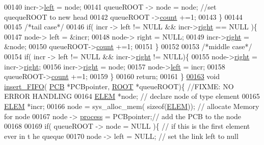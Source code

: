 \begin{DoxyCode}
00140                 incr->\hyperlink{structpage_a450d16b8cb803158a4dab05bb36fd7f5}{left} = node;
00141                 queueROOT -> node = node; \textcolor{comment}{//set quequeROOT to new head}
00142                 queueROOT ->\hyperlink{structroot_afa78d0408d4af29e936332a04739d59c}{count} +=1;
00143         \}
00144         
00145         \textcolor{comment}{/*tail case*/}
00146         \textcolor{keywordflow}{if}( incr -> left != NULL && incr->\hyperlink{structpage_a59bb1b5eca2d579befcc93a2833f4dfd}{right} == NULL )\{
00147                 node-> left = &incr;
00148                 node-> right = NULL;
00149                 incr->\hyperlink{structpage_a59bb1b5eca2d579befcc93a2833f4dfd}{right} = &node;
00150                 queueROOT->\hyperlink{structroot_afa78d0408d4af29e936332a04739d59c}{count} +=1;
00151         \}
00152         
00153         \textcolor{comment}{/*middle case*/}
00154         \textcolor{keywordflow}{if}( incr -> left != NULL && incr->\hyperlink{structpage_a59bb1b5eca2d579befcc93a2833f4dfd}{right} != NULL)\{
00155                 node->\hyperlink{structpage_a59bb1b5eca2d579befcc93a2833f4dfd}{right} = incr->\hyperlink{structpage_a59bb1b5eca2d579befcc93a2833f4dfd}{right};
00156                 incr->\hyperlink{structpage_a59bb1b5eca2d579befcc93a2833f4dfd}{right} = node;
00157                 node->\hyperlink{structpage_a450d16b8cb803158a4dab05bb36fd7f5}{left} = incr;
00158                 queueROOT->\hyperlink{structroot_afa78d0408d4af29e936332a04739d59c}{count} +=1;
00159         \}
00160         \textcolor{keywordflow}{return};
00161 \}
\hypertarget{mpx__r2_8c_source_l00163}{}\hyperlink{mpx__r2_8h_a89d5f57a5b157787f44875a8f27a6233}{00163} \textcolor{keywordtype}{void} \hyperlink{mpx__r2_8c_a58a3e3525ed6385f632835b55ab7d7d1}{insert_FIFO}( \hyperlink{structprocess}{PCB} *PCBpointer, \hyperlink{structroot}{ROOT} *queueROOT)\{ \textcolor{comment}{//FIXME: NO ERROR HANDLING}
00164         \hyperlink{structpage}{ELEM} *node; \textcolor{comment}{// declare node of type element}
00165         \hyperlink{structpage}{ELEM} *incr;
00166         node = sys\_alloc\_mem( \textcolor{keyword}{sizeof}(\hyperlink{structpage}{ELEM})); \textcolor{comment}{// allocate Memory for node}
00167         node -> \hyperlink{structprocess}{process} = PCBpointer;\textcolor{comment}{// add the PCB to the node}
00168         
00169         \textcolor{keywordflow}{if}( queueROOT -> node = NULL )\{ \textcolor{comment}{// if this is the first element ever in t
      he queque}
00170                 node -> left = NULL; \textcolor{comment}{// set the link left to null}

\end{DoxyCode}
